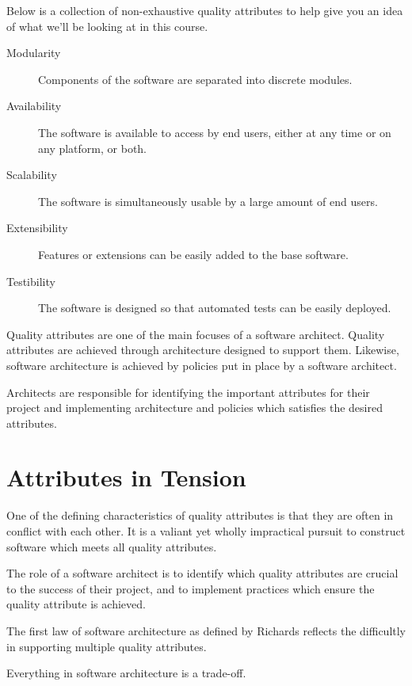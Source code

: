 Below is a collection of non-exhaustive quality attributes to help give you an idea of what we'll be looking at in this course.

\begin{description}
    \item[Modularity] Components of the software are separated into discrete modules.
    \item[Availability] The software is available to access by end users, either at any time or on any platform, or both.
    \item[Scalability] The software is simultaneously usable by a large amount of end users.
    \item[Extensibility] Features or extensions can be easily added to the base software.
    \item[Testibility] The software is designed so that automated tests can be easily deployed.
\end{description}

Quality attributes are one of the main focuses of a software architect.
Quality attributes are achieved through architecture designed to support them.
Likewise, software architecture is achieved by policies put in place by a software architect.

Architects are responsible for identifying the important attributes for their project
and implementing architecture and policies which satisfies the desired attributes.

\section{Attributes in Tension}
One of the defining characteristics of quality attributes is that they are often in conflict with each other.
It is a valiant yet wholly impractical pursuit to construct software which meets all quality attributes.

The role of a software architect is to identify which quality attributes are crucial to the success of their project,
and to implement practices which ensure the quality attribute is achieved.

The first law of software architecture as defined by Richards \cite{richards2020fundamentals} reflects the difficultly in supporting multiple quality attributes.

\begin{definition}
Everything in software architecture is a trade-off.
\end{definition}

